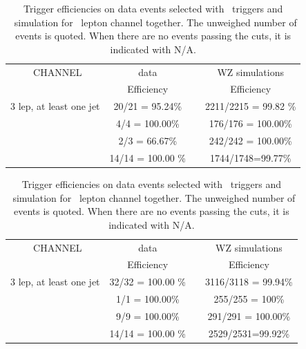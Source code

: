 \begin{table}[htbp]
	\centering
	\caption{Trigger efficiencies on data events selected with \Etmis\ triggers and \WZ\ simulation for \eee\ lepton channel together. The unweighed number of events is quoted. When there are no events passing the cuts, it is indicated with N/A. }

	\begin{tabular}{cccc}
		\toprule 
		\eee\ CHANNEL & {data} & &{WZ simulations} \\ 
		& Efficiency &  & Efficiency \\
		\midrule
		3 lep,  at least one jet & 20/21 = 95.24\%  &  & 2211/2215 = 99.82 \% \\ 
		\hline 
		\STSR & 4/4 = 100.00\% & & 176/176 = 100.00\%  \\ 
		\hline 
		\TTSR & 2/3 = 66.67\% &  & 242/242 = 100.00\%  \\ 
		\hline 
		\WZCR & 14/14 = 100.00 \% &  & 1744/1748=99.77\%  \\ 
		\bottomrule
	\end{tabular} 
\end{table}
\begin{table}[htbp]
	\centering
	\caption{Trigger efficiencies on data events selected with \Etmis\ triggers and \WZ\ simulation for \eemu\ lepton channel together. The unweighed number of events is quoted. When there are no events passing the cuts, it is indicated with N/A. }

	\begin{tabular}{cccc}
		\toprule
		\eemu\ CHANNEL & {data} & & {WZ simulations} \\ 
		& Efficiency &  & Efficiency  \\
		\midrule
		3 lep,  at least one jet & 32/32 = 100.00 \% & & 3116/3118 = 99.94\%  \\ 
		\hline 
		\STSR & 1/1 = 100.00\%& & 255/255 = 100\%  \\ 
		\hline 
		\TTSR & 9/9 = 100.00\% &  &291/291 = 100.00\%  \\ 
		\hline 
		\WZCR & 14/14 = 100.00 \% &  & 2529/2531=99.92\% \\ 
		\bottomrule
	\end{tabular} 
\end{table}	
